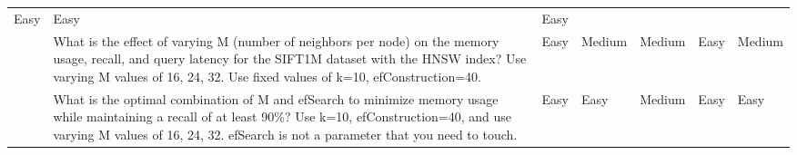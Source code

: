 \begin{table}[H]
{\begin{tabular}{p{3cm}|p{10cm}|p{5cm}|p{5cm}|p{5cm}|p{5cm}|p{1cm}}
  \multicolumn{1}{l|}{Easy} &
  \multicolumn{1}{l|}{Easy} &
  Easy \\ \cline{2-7} 
 &
  What is the effect of varying M (number of neighbors per node) on the memory usage, recall, and query latency for the SIFT1M dataset with the HNSW index? Use varying M values of 16, 24, 32. Use fixed values of k=10, efConstruction=40. &
  \multicolumn{1}{l|}{Easy} &
  \multicolumn{1}{l|}{Medium} &
  \multicolumn{1}{l|}{Medium} &
  \multicolumn{1}{l|}{Easy} &
  Medium \\ \cline{2-7} 
 &
  What is the optimal combination of M and efSearch to minimize memory usage while maintaining a recall of at least 90\%? Use k=10, efConstruction=40, and use varying M values of 16, 24, 32. efSearch is not a parameter that you need to touch. &
  \multicolumn{1}{l|}{Easy} &
  \multicolumn{1}{l|}{Easy} &
  \multicolumn{1}{l|}{Medium} &
  \multicolumn{1}{l|}{Easy} &
  Easy \\ \hline
 
  \end{tabular}%
 }
\end{table}


